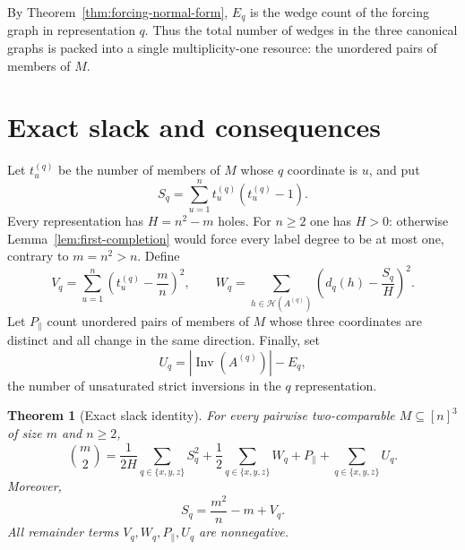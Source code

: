 \documentclass[11pt]{article}
\numberwithin{equation}{section}
\newtheorem{theorem}{Theorem}[section]
\theoremstyle{definition}
\theoremstyle{remark}
\newcommand{\Hcal}{\mathcal H}
\newcommand{\Inv}{\operatorname{Inv}}
\begin{document}
By Theorem~\ref{thm:forcing-normal-form}, $E_q$ is the wedge count of the
forcing graph in representation $q$.  Thus the total number of wedges in the
three canonical graphs is packed into a single multiplicity-one resource:
the unordered pairs of members of $M$.

\section{Exact slack and consequences}
\label{sec:exact-slack}

Let $t_u^{(q)}$ be the number of members of $M$ whose $q$ coordinate is $u$,
and put
\begin{equation}\label{eq:def-Sq}
 S_q=\sum_{u=1}^n t_u^{(q)}(t_u^{(q)}-1).
\end{equation}
Every representation has $H=n^2-m$ holes.  For $n\ge2$ one has $H>0$:
otherwise Lemma~\ref{lem:first-completion} would force every label degree to be
at most one, contrary to $m=n^2>n$.  Define
\begin{equation}\label{eq:def-variances}
 V_q=\sum_{u=1}^n\left(t_u^{(q)}-\frac mn\right)^2,\qquad
 W_q=\sum_{h\in\Hcal(A^{(q)})}
 \left(d_q(h)-\frac{S_q}{H}\right)^2.
\end{equation}
Let $P_{\parallel}$ count unordered pairs of members of $M$ whose three
coordinates are distinct and all change in the same direction.  Finally, set
\[
 U_q=|\Inv(A^{(q)})|-E_q,
\]
the number of unsaturated strict inversions in the $q$ representation.

\begin{theorem}[Exact slack identity]\label{thm:exact-slack}
For every pairwise two-comparable $M\subseteq[n]^3$ of size $m$ and $n\ge2$,
\begin{equation}\label{eq:exact-slack}
 \boxed{
 \binom m2
 =\frac1{2H}\sum_{q\in\{x,y,z\}}S_q^2
 +\frac12\sum_{q\in\{x,y,z\}}W_q
 +P_{\parallel}+\sum_{q\in\{x,y,z\}}U_q.}
\end{equation}
Moreover,
\begin{equation}\label{eq:coordinate-slack}
 S_q=\frac{m^2}{n}-m+V_q.
\end{equation}
All remainder terms $V_q,W_q,P_{\parallel},U_q$ are nonnegative.
\end{theorem}
\end{document}
